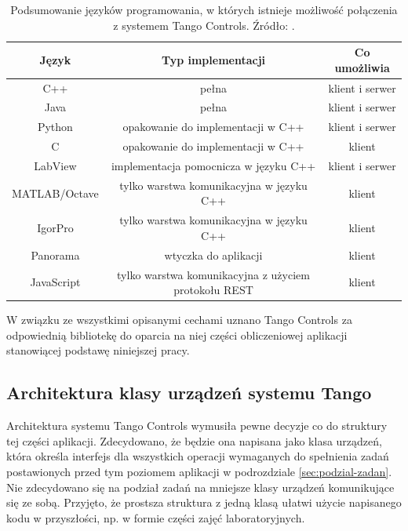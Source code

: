 \begin{table}[hpt]
    \centering
    \begin{tabular}{|c|c|c|}
        \hline 
        \textbf{Język} & \textbf{Typ implementacji} &\textbf{Co umożliwia} \\ 
        \hline 
        C++ & pełna & klient i serwer \\ 
        \hline 
        Java & pełna & klient i serwer \\ 
        \hline 
        Python & opakowanie do implementacji w C++ & klient i serwer \\ 
        \hline 
        C & opakowanie do implementacji w C++ & klient \\ 
        \hline 
        LabView & implementacja pomocnicza w języku C++ & klient i serwer \\ 
        \hline 
        MATLAB/Octave & tylko warstwa komunikacyjna w języku C++ & klient \\ 
        \hline 
        IgorPro & tylko warstwa komunikacyjna w języku C++ & klient \\ 
        \hline 
        Panorama & wtyczka do aplikacji & klient \\ 
        \hline 
        JavaScript & tylko warstwa komunikacyjna z użyciem protokołu REST & klient \\ 
        \hline 
    \end{tabular}
    \caption{Podsumowanie języków programowania, w których istnieje możliwość połączenia z systemem Tango Controls. Źródło: \cite{TangoWebsite}.}
    \label{tab:tango-implementations}
\end{table}

W związku ze wszystkimi opisanymi cechami uznano Tango Controls za odpowiednią bibliotekę do oparcia na niej części obliczeniowej aplikacji stanowiącej podstawę niniejszej pracy.


\subsection{Architektura klasy urządzeń systemu Tango}
\label{sub:czesc-wyzsza-klasa}

Architektura systemu Tango Controls wymusiła pewne decyzje co do struktury tej części aplikacji. Zdecydowano, że będzie ona napisana jako klasa urządzeń, która określa interfejs dla wszystkich operacji wymaganych do spełnienia zadań postawionych przed tym poziomem aplikacji w podrozdziale \ref{sec:podzial-zadan}. Nie zdecydowano się na podział zadań na mniejsze klasy urządzeń komunikujące się ze sobą. Przyjęto, że prostsza struktura z jedną klasą ułatwi użycie napisanego kodu w przyszłości, np. w formie części zajęć laboratoryjnych.

